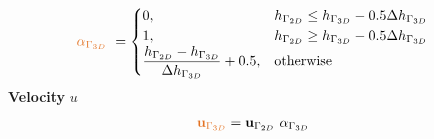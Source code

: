 \begin{frame}
\begin{minipage}{0.38\textwidth}
\begin{itemize}
\begin{align*}
 \myTUMorange{\alpha_{\Gamma_{3D}}}\ &=  \begin{cases}
	0, &  \htwD \leq \hthD - 0.5 \Delta \hthD\\
	1, &  \htwD \geq \hthD - 0.5 \Delta \hthD\\
	\dfrac{\htwD-\hthD}{\Delta \hthD} + 0.5, & \text{otherwise}
	\end{cases}
\end{align*}
\textbf{Velocity} $u$
\begin{align*}
 \myTUMorange{\uthD} &= \utwD \ \alpha_{\Gamma_{3D}}
\end{align*}
\end{itemize}
\end{minipage}

\end{frame}



